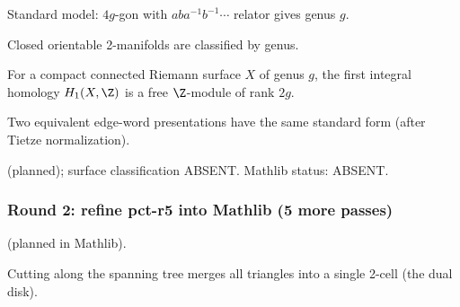 \begin{lemma}
\label{lem:toh-r7}
Standard model: $4g$-gon with $aba^{-1}b^{-1}\cdots$ relator gives genus $g$.
\leanok
\end{lemma}

\begin{lemma}
\label{lem:toh-r8}
Closed orientable 2-manifolds are classified by genus.
\leanok
\end{lemma}

\begin{lemma}
\label{lem:h1-free-of-genus}
For a compact connected Riemann surface $X$ of genus $g$,
the first integral homology $H_{1}(X, \Z)$ is a free $\Z$-module
of rank $2g$.
\leanok
\end{lemma}

\begin{lemma}
\label{lem:toh-r9}
Two equivalent edge-word presentations have the same standard form (after Tietze normalization).
\leanok
\end{lemma}

\begin{lemma}
\label{lem:toh-r10}
 (planned); surface classification ABSENT.  Mathlib status: ABSENT.
\leanok
\end{lemma}

\subsubsection*{Round 2: refine pct-r5 into Mathlib (5 more passes)}

\begin{lemma}
\label{lem:pct-r6}
 (planned in Mathlib).
\leanok\mathlibok
\end{lemma}

\begin{lemma}
\label{lem:pct-r7}
Cutting along the spanning tree merges all triangles into a single 2-cell (the dual disk).
\leanok
\end{lemma}

